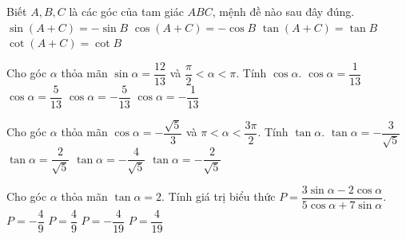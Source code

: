 \begin{ex}%
	Biết $A,B,C$ là các góc của tam giác $ABC$, mệnh đề nào sau đây đúng.
	\choice
	{$\sin \left({A+C}\right)=-\sin B$}
	{\True $\cos \left({A+C}\right)=-\cos B$}
	{$\tan \left({A+C}\right)=\tan B$}
	{$\cot \left({A+C}\right)=\cot B$}
\end{ex}


\begin{ex}%
	Cho góc $\alpha $ thỏa mãn $\sin \alpha =\dfrac{{12}}{{13}}$ và $\dfrac{\pi}{2}<\alpha <\pi $. Tính $\cos \alpha.$
	\choice
	{$\cos \alpha =\dfrac{1}{{13}}$}
	{$\cos \alpha =\dfrac{5}{{13}}$}
	{\True $\cos \alpha =-\dfrac{5}{{13}}$}
	{$\cos \alpha =-\dfrac{1}{{13}}$}
\end{ex}

\begin{ex}%
	Cho góc $\alpha $ thỏa mãn $\cos \alpha =-\dfrac{{\sqrt{5}}}{3}$ và $\pi <\alpha <\dfrac{{3\pi}}{2}$. Tính $\tan \alpha.$
	\choice
	{$\tan \alpha =-\dfrac{3}{{\sqrt{5}}}$}
	{\True $\tan \alpha =\dfrac{2}{{\sqrt{5}}}$}
	{$\tan \alpha =-\dfrac{4}{{\sqrt{5}}}$}
	{$\tan \alpha =-\dfrac{2}{{\sqrt{5}}}$}
\end{ex}

\begin{ex}%
	Cho góc $\alpha $ thỏa mãn $\tan \alpha =2.$ Tính giá trị biểu thức $P=\dfrac{{3\sin \alpha-2\cos \alpha}}{{5\cos \alpha+7\sin \alpha}}.$ 
	\choice
	{$P=-\dfrac{4}{9}$}
	{$P=\dfrac{4}{9}$}
	{$P=-\dfrac{4}{{19}}$}
	{\True $P=\dfrac{4}{{19}}$}
\end{ex}

